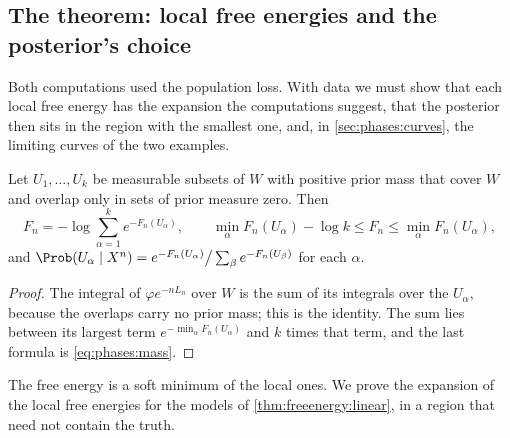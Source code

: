 \begin{refsection}
\section{The theorem: local free energies and the posterior's choice}\label{sec:phases:local}

Both computations used the population loss. With data we must show that each local free energy has the expansion the computations suggest, that the posterior then sits in the region with the smallest one, and, in \cref{sec:phases:curves}, the limiting curves of the two examples.

\begin{lemma}\label{lem:phases:softmin}
Let $U_1,\dots,U_k$ be measurable subsets of $W$ with positive prior mass that cover $W$ and overlap only in sets of prior measure zero. Then
\[
F_n=-\log\sum_{\alpha=1}^ke^{-F_n(U_\alpha)},\qquad \min_\alpha F_n(U_\alpha)-\log k\le F_n\le\min_\alpha F_n(U_\alpha),
\]
and $\Prob(U_\alpha\mid X^n)=e^{-F_n(U_\alpha)}\big/\sum_\beta e^{-F_n(U_\beta)}$ for each $\alpha$.
\end{lemma}

\begin{proof}
The integral of $\varphi e^{-nL_n}$ over $W$ is the sum of its integrals over the $U_\alpha$, because the overlaps carry no prior mass; this is the identity. The sum lies between its largest term $e^{-\min_\alpha F_n(U_\alpha)}$ and $k$ times that term, and the last formula is \eqref{eq:phases:mass}.
\end{proof}

The free energy is a soft minimum of the local ones. We prove the expansion of the local free energies for the models of \cref{thm:freeenergy:linear}, in a region that need not contain the truth.


\end{refsection}
